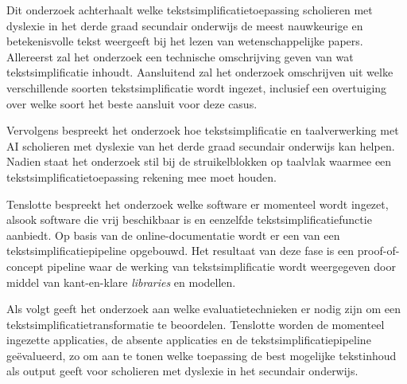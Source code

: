 

Dit onderzoek achterhaalt welke tekstsimplificatietoepassing scholieren met dyslexie in het derde graad secundair onderwijs de meest nauwkeurige en betekenisvolle tekst weergeeft bij het lezen van wetenschappelijke papers. Allereerst zal het onderzoek een technische omschrijving geven van wat tekstsimplificatie inhoudt. Aansluitend zal het onderzoek omschrijven uit welke verschillende soorten tekstsimplificatie wordt ingezet, inclusief een overtuiging over welke soort het beste aansluit voor deze casus. 

Vervolgens bespreekt het onderzoek hoe tekstsimplificatie en taalverwerking met AI scholieren met dyslexie van het derde graad secundair onderwijs kan helpen. Nadien staat het onderzoek stil bij de struikelblokken op taalvlak waarmee een tekstsimplificatietoepassing rekening mee moet houden. 

Tenslotte bespreekt het onderzoek welke software er momenteel wordt ingezet, alsook software die vrij beschikbaar is en eenzelfde tekstsimplificatiefunctie aanbiedt. Op basis van de online-documentatie wordt er een van een tekstsimplificatiepipeline opgebouwd. Het resultaat van deze fase is een proof-of-concept pipeline waar de werking van tekstsimplificatie wordt weergegeven door middel van kant-en-klare \textit{libraries} en modellen.


Als volgt geeft het onderzoek aan welke evaluatietechnieken er nodig zijn om een tekstsimplificatietransformatie te beoordelen. Tenslotte worden de momenteel ingezette applicaties, de absente applicaties en de tekstsimplificatiepipeline geëvalueerd, zo om aan te tonen welke toepassing de best mogelijke tekstinhoud als output geeft voor scholieren met dyslexie in het secundair onderwijs.


